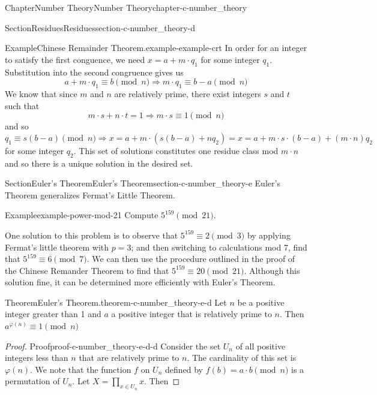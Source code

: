\documentclass[oneside,10pt,]{book}
\numberwithin{equation}{section}
\begin{document}
\begin{chapterptx}{Chapter}{Number Theory}{}{Number Theory}{}{}{chapter-c-number_theory}
\begin{sectionptx}{Section}{Residues}{}{Residues}{}{}{section-c-number_theory-d}
\begin{example}{Example}{Chinese Remainder Theorem.}{example-example-crt}
In order for an integer to satisfy the first conguence, we need \(x = a + m\cdot q_1\) for some integer \(q_1\).  Substitution into the second congruence gives us%
\begin{equation*}
a + m\cdot q_1\equiv b \pmod{n} \Rightarrow  m\cdot q_1\equiv b-a \pmod{n}
\end{equation*}
We know that since \(m\) and \(n\) are relatively prime, there exist integers \(s\) and \(t\) such that%
\begin{equation*}
m \cdot s + n \cdot t = 1  \Rightarrow   m \cdot s \equiv 1 \pmod{n}
\end{equation*}
and so%
\begin{equation*}
q_1\equiv s(b-a) \pmod{n}  \Rightarrow   x = a + m\cdot (s(b-a)+ n q_2)= x = a + m\cdot s\cdot(b-a)+ (m\cdot n) q_2 
\end{equation*}
for some integer \(q_2\). This set of solutions constitutes one residue class mod \(m \cdot n\) and so there is a unique solution in the desired set.%
\end{example}
\end{sectionptx}
%
%
\typeout{************************************************}
\typeout{************************************************}
%
\begin{sectionptx}{Section}{Euler's Theorem}{}{Euler's Theorem}{}{}{section-c-number_theory-e}
Euler's Theorem generalizes Fermat's Little Theorem.%
\begin{example}{Example}{}{example-power-mod-21}%
Compute \(5^{159} \pmod{21}\).%
\par
One solution to this problem is to observe that \(5^{159}\equiv 2 \pmod{3}\)  by applying Fermat's little theorem with \(p=3\); and then switching to calculations mod 7, find that \(5^{159}\equiv 6 \pmod{7}\).  We can then use the procedure outlined in the proof of the Chinese Remander Theorem to find that \(5^{159}\equiv 20 \pmod{21}\). Although this solution fine, it can be determined more efficiently with Euler's Theorem.%
\end{example}
\begin{theorem}{Theorem}{Euler's Theorem.}{}{theorem-c-number_theory-e-d}%
%
Let \(n\) be a positive integer greater than 1 and \(a\) a positive integer that is relatively prime to \(n\).  Then  \(a^{\varphi(n)} \equiv 1 \pmod{n}\)%
\end{theorem}
\begin{proof}{Proof}{}{proof-c-number_theory-e-d-d}
Consider the set \(U_n\) of all positive integers less than \(n\) that are relatively prime to \(n\). The cardinality of this set is \(\varphi(n)\).  We note that the function \(f\) on \(U_n\) defined by \(f(b) = a \cdot b \pmod{n}\) is a permutation of \(U_n\). Let \(X=\prod_{x \in U_n} x\). Then%

\end{proof}
\end{sectionptx}
\end{chapterptx}
\end{document}
